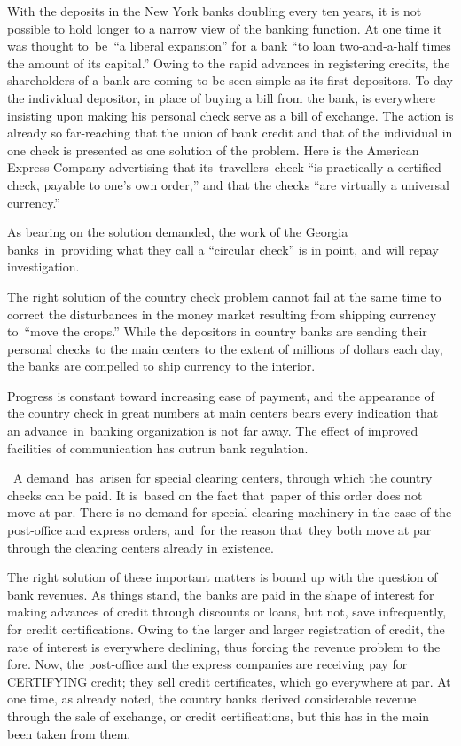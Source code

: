 \documentclass[openany,nobib]{tufte-book}
\begin{document}
With the deposits in the New York banks doubling every ten years, it is
not possible to hold longer to a narrow view of the banking function. At
one time it was thought to~be~``a liberal expansion'' for a bank ``to
loan two-and-a-half times the amount of its capital.'' Owing to the
rapid advances in registering credits, the shareholders of a bank are
coming to be seen simple as its first depositors. To-day the individual
depositor, in place of buying a bill from the bank, is everywhere
insisting upon making his personal check serve as a bill of exchange.
The action is already so far-reaching that the union of bank credit and
that of the individual in one check is presented as one solution of the
problem. Here is the American Express Company advertising that
its~travellers~check ``is practically a certified check, payable to
one's own order,'' and that the checks ``are virtually a universal
currency.'' ~

As bearing on the solution demanded, the work of the Georgia
banks~in~providing what they call a ``circular check'' is in point, and
will repay investigation.~~

The right solution of the country check problem cannot fail at the same
time to correct the disturbances in the money market resulting from
shipping currency to~``move the crops.'' While the depositors in country
banks are sending their personal checks to the main centers to the
extent of millions of dollars each day, the banks are compelled to ship
currency to the interior.~

Progress is constant toward increasing ease of payment, and the
appearance of the country check in great numbers at main centers bears
every indication that an advance~in~banking organization is not far
away. The effect of improved facilities of communication has outrun bank
regulation.~~

~A demand~has~arisen for special clearing centers, through which the
country checks can be paid. It is~based on the fact that~paper of this
order does not move at par. There is no demand for special clearing
machinery in the case of the post-office and express orders, and~for the
reason that~they both move at par through the clearing centers already
in existence. ~

The right solution of these important matters is bound up with the
question of bank revenues. As things stand, the banks are paid in the
shape of interest for making advances of credit through discounts or
loans, but not, save infrequently, for credit certifications. Owing to
the larger and larger registration of credit, the rate of interest is
everywhere declining, thus forcing the revenue problem to the fore. Now,
the post-office and the express companies are receiving pay for
CERTIFYING credit; they sell credit certificates, which go everywhere at
par. At one time, as already noted, the country banks derived
considerable revenue through the sale of exchange, or credit
certifications, but this has in the main been taken from them.~~
\end{document}
